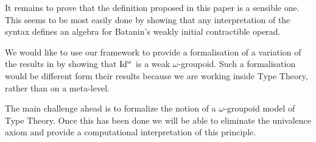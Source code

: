 It remains to prove that the definition proposed in this paper is a
sensible one. This seems to be most easily done by showing that any
interpretation of the syntax defines an algebra for Batanin's weakly
initial contractible operad. 

We would like to use our framework to provide a formalisation of a
variation of the results in
\cite{lumsdaine10:weak-o-categories,berg08:types-are} by showing that
$\mathrm{Id}^\omega$ is a weak $\omega$-groupoid. Such a formalisation would be
different form their results because we are working inside Type
Theory, rather than on a meta-level.

The main challenge ahead is to formalize the notion of a
$\omega$-groupoid model of Type Theory. Once this has been done we
will be able to eliminate the univalence axiom and provide a
computational interpretation of this principle.





